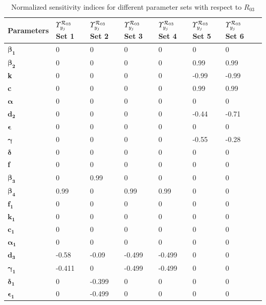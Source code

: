 \begin{table}
\centering
    \begin{tabular}{|p{3cm}|p{1.6cm}|p{1.6cm}|p{1.6cm}|p{1.6cm}|p{1.6cm}|p{1.6cm}|p{1.6cm}|}
    \hline
               Parameters      & \textbf{$\varUpsilon^{{{\cal R}}_{03}}_{y_j}$ Set 1} & \textbf{$\varUpsilon^{{{\cal R}}_{03}}_{y_j}$ Set 2} & \textbf{$\varUpsilon^{{{\cal R}}_{03}}_{y_j}$ Set 3} & \textbf{$\varUpsilon^{{{\cal R}}_{03}}_{y_j}$ Set 4} & \textbf{$\varUpsilon^{{{\cal R}}_{03}}_{y_j}$ Set 5} & \textbf{$\varUpsilon^{{{\cal R}}_{03}}_{y_j}$ Set 6} \\
            \hline
  $\boldsymbol {\beta_{1}} $                 & 0 & 0 & 0 & 0 & 0 & 0  \\
  $\boldsymbol {\beta_{2}} $      & 0 & 0 & 0 & 0 & 0.99 & 0.99  \\
  \textbf {k}       & 0 & 0 & 0 & 0 & -0.99 & -0.99  \\
  \textbf{c}                & 0 & 0 & 0 & 0 & 0.99 & 0.99  \\
  $\boldsymbol{\alpha}$          & 0 & 0 & 0 & 0 & 0 & 0  \\
  $\mathbf {d _{2} }$           & 0 & 0 & 0 & 0 & -0.44 & -0.71  \\
  $\boldsymbol{\epsilon}$          & 0 & 0 & 0 & 0 & 0 & 0  \\
  $\boldsymbol{\gamma}$                & 0 & 0 & 0 & 0 & -0.55 & -0.28  \\
  $\boldsymbol{\delta}$        & 0 & 0 & 0 & 0 & 0 & 0  \\
  \textbf{f}           & 0 & 0 & 0 & 0 & 0 & 0  \\
  $\boldsymbol {\beta_{3}}$          & 0 & 0.99 & 0 & 0 & 0 & 0  \\
  $\boldsymbol {\beta_{4}}$             & 0.99 & 0 & 0.99 & 0.99 & 0 & 0  \\
  $\mathbf{f_{1} } $         & 0 & 0 & 0 & 0 & 0 & 0  \\
  $\mathbf{k_{1} }  $        & 0 & 0 & 0 & 0 & 0 & 0  \\
  $\mathbf{c_{1} } $         & 0 & 0 & 0 & 0 & 0 & 0  \\
  $\boldsymbol {\alpha_{1}}$          & 0 & 0 & 0 & 0 & 0 & 0  \\
  $\mathbf{d_{3}}$          & -0.58 & -0.09 & -0.499 & -0.499 & 0 & 0  \\
  $\boldsymbol {\gamma_{1}}$          & -0.411 & 0 & -0.499 & -0.499 & 0 & 0  \\
  $\boldsymbol {\delta_{1}}$         & 0 & -0.399 & 0 & 0 & 0 & 0  \\
  $\boldsymbol {\epsilon_{1}}$          & 0 & -0.499 & 0 & 0 & 0 & 0  \\
  \hline
    \end{tabular}
\caption{Normalized sensitivity indices for different parameter sets with respect to $R_{03}$}\label{T4}
\end{table}
